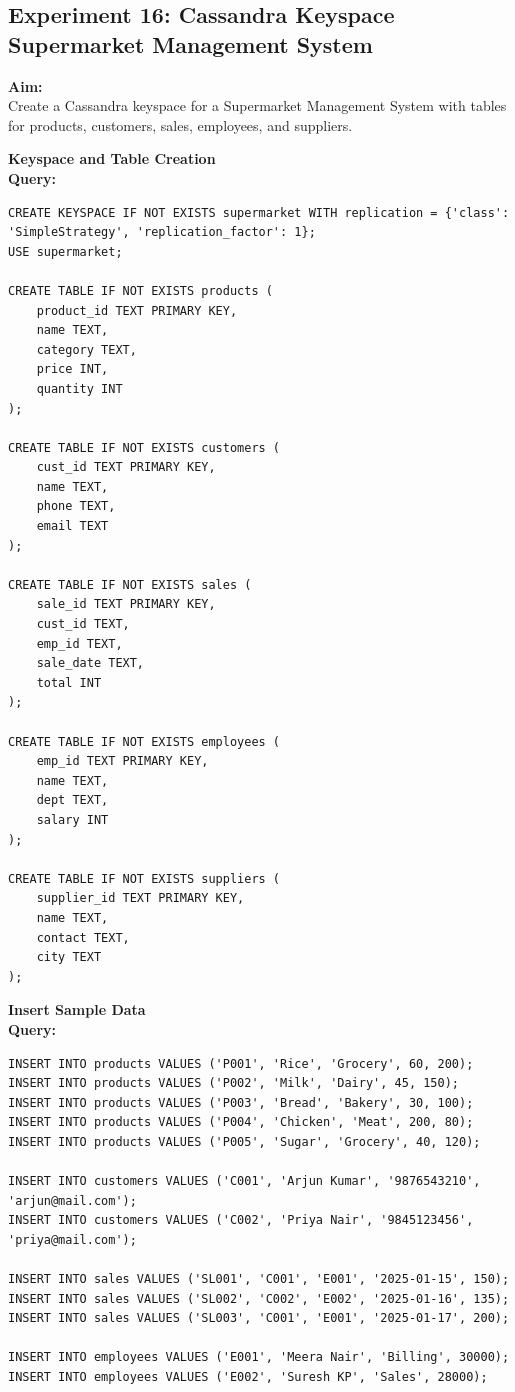 \documentclass[12pt, a4paper]{article}
\begin{document}
\newpage
\subsection*{Experiment 16: Cassandra Keyspace Supermarket Management System}

\textbf{Aim:}\\
Create a Cassandra keyspace for a Supermarket Management System with tables for products, customers, sales, employees, and suppliers.

\textbf{Keyspace and Table Creation}\\
\textbf{Query:}
\begin{lstlisting}
CREATE KEYSPACE IF NOT EXISTS supermarket WITH replication = {'class': 'SimpleStrategy', 'replication_factor': 1};
USE supermarket;

CREATE TABLE IF NOT EXISTS products (
    product_id TEXT PRIMARY KEY,
    name TEXT,
    category TEXT,
    price INT,
    quantity INT
);

CREATE TABLE IF NOT EXISTS customers (
    cust_id TEXT PRIMARY KEY,
    name TEXT,
    phone TEXT,
    email TEXT
);

CREATE TABLE IF NOT EXISTS sales (
    sale_id TEXT PRIMARY KEY,
    cust_id TEXT,
    emp_id TEXT,
    sale_date TEXT,
    total INT
);

CREATE TABLE IF NOT EXISTS employees (
    emp_id TEXT PRIMARY KEY,
    name TEXT,
    dept TEXT,
    salary INT
);

CREATE TABLE IF NOT EXISTS suppliers (
    supplier_id TEXT PRIMARY KEY,
    name TEXT,
    contact TEXT,
    city TEXT
);
\end{lstlisting}

\textbf{Insert Sample Data}\\
\textbf{Query:}
\begin{lstlisting}
INSERT INTO products VALUES ('P001', 'Rice', 'Grocery', 60, 200);
INSERT INTO products VALUES ('P002', 'Milk', 'Dairy', 45, 150);
INSERT INTO products VALUES ('P003', 'Bread', 'Bakery', 30, 100);
INSERT INTO products VALUES ('P004', 'Chicken', 'Meat', 200, 80);
INSERT INTO products VALUES ('P005', 'Sugar', 'Grocery', 40, 120);

INSERT INTO customers VALUES ('C001', 'Arjun Kumar', '9876543210', 'arjun@mail.com');
INSERT INTO customers VALUES ('C002', 'Priya Nair', '9845123456', 'priya@mail.com');

INSERT INTO sales VALUES ('SL001', 'C001', 'E001', '2025-01-15', 150);
INSERT INTO sales VALUES ('SL002', 'C002', 'E002', '2025-01-16', 135);
INSERT INTO sales VALUES ('SL003', 'C001', 'E001', '2025-01-17', 200);

INSERT INTO employees VALUES ('E001', 'Meera Nair', 'Billing', 30000);
INSERT INTO employees VALUES ('E002', 'Suresh KP', 'Sales', 28000);
\end{lstlisting}
\end{document}
